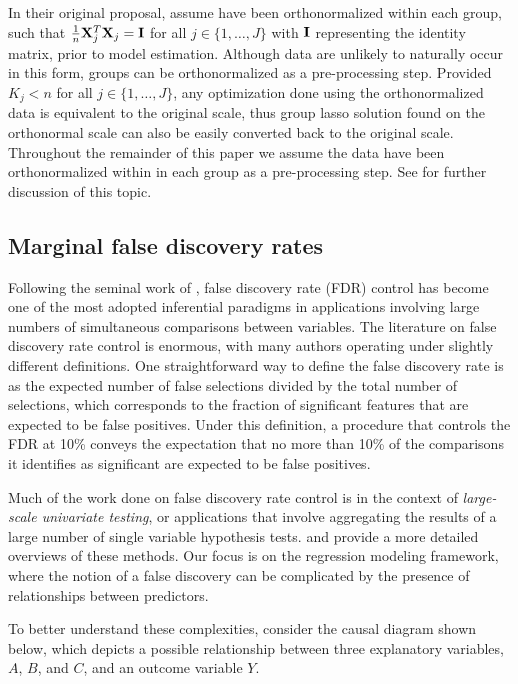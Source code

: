In their original proposal, \citet{Yuan2006} assume have been orthonormalized within each group, such that $\tfrac{1}{n}\mathbf{X}_j^T\mathbf{X}_j = \mathbf{I}$ for all $j \in \{1, \ldots, J\}$ with $\mathbf{I}$ representing the identity matrix, prior to model estimation. Although data are unlikely to naturally occur in this form, groups can be orthonormalized as a pre-processing step. Provided $K_j < n$ for all $j \in \{1, \ldots, J\}$, any optimization done using the orthonormalized data is equivalent to the original scale, thus group lasso solution found on the orthonormal scale can also be easily converted back to the original scale. Throughout the remainder of this paper we assume the data have been orthonormalized within in each group as a pre-processing step. See \citet{Simon2012} for further discussion of this topic.


\subsection{Marginal false discovery rates}

Following the seminal work of \citet{BH_1995}, false discovery rate (FDR) control has become one of the most adopted inferential paradigms in applications involving large numbers of simultaneous comparisons between variables. The literature on false discovery rate control is enormous, with many authors operating under slightly different definitions. One straightforward way to define the false discovery rate is as the expected number of false selections divided by the total number of selections, which corresponds to the fraction of significant features that are expected to be false positives. Under this definition, a procedure that controls the FDR at 10\% conveys the expectation that no more than 10\% of the comparisons it identifies as significant are expected to be false positives. 

Much of the work done on false discovery rate control is in the context of \textit{large-scale univariate testing}, or applications that involve aggregating the results of a large number of single variable hypothesis tests. \citet{Farcomeni2008} and \citet{Strimmer2008} provide a more detailed overviews of these methods. Our focus is on the regression modeling framework, where the notion of a false discovery can be complicated by the presence of relationships between predictors. 

To better understand these complexities, consider the causal diagram shown below, which depicts a possible relationship between three explanatory variables, $A$, $B$, and $C$, and an outcome variable $Y$.

